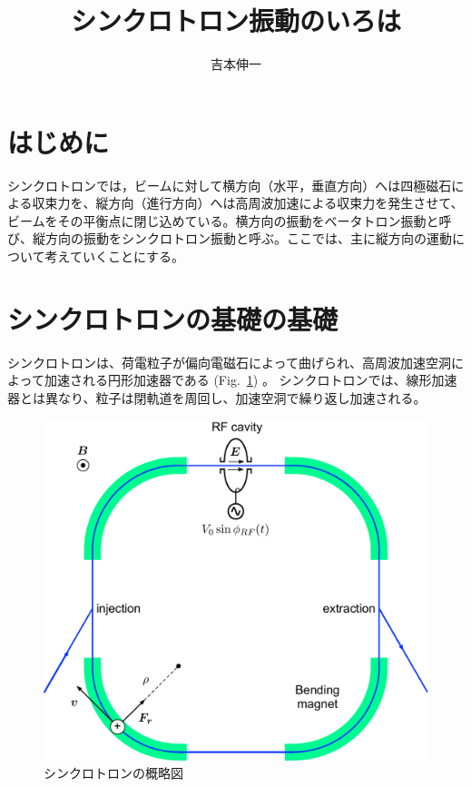 \documentclass[10pt,a4paper]{ltjsarticle}
\begin{document}
\title{シンクロトロン振動のいろは}
\author{吉本伸一}
\maketitle
\tableofcontents
\clearpage

\section{はじめに}
シンクロトロンでは，ビームに対して横方向（水平，垂直方向）へは四極磁石による収束力を、縦方向（進行方向）へは高周波加速による収束力を発生させて、ビームをその平衡点に閉じ込めている。横方向の振動をベータトロン振動と呼び、縦方向の振動をシンクロトロン振動と呼ぶ。ここでは、主に縦方向の運動について考えていくことにする。

\section{シンクロトロンの基礎の基礎}
シンクロトロンは、荷電粒子が偏向電磁石によって曲げられ、高周波加速空洞によって加速される円形加速器である (Fig.~\ref{synchrotron}) 。
シンクロトロンでは、線形加速器とは異なり、粒子は閉軌道を周回し、加速空洞で繰り返し加速される。
%
\begin{figure}[hbt]
  \begin{center}
    \includegraphics[width=12cm,clip]{synchrotron.pdf}
    \caption{シンクロトロンの概略図}
   \label{synchrotron}
  \end{center}
\end{figure}
\end{document}

